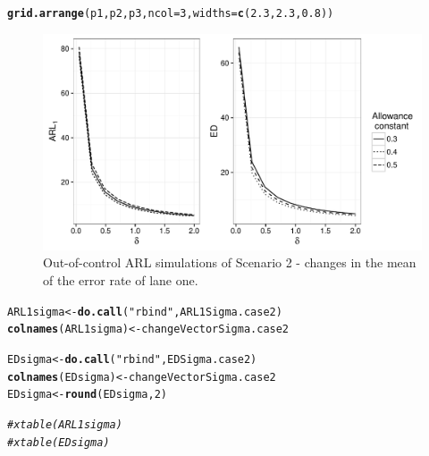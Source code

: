 \documentclass[a4paper,11pt,fleqn,twoside,notitlepage]{report}
\makeatletter
\def\maxwidth{ %
  \ifdim\Gin@nat@width>\linewidth
    \linewidth
  \else
    \Gin@nat@width
  \fi
}
\newcommand{\hlnum}[1]{\textcolor[rgb]{0.686,0.059,0.569}{#1}}%
\newcommand{\hlstr}[1]{\textcolor[rgb]{0.192,0.494,0.8}{#1}}%
\newcommand{\hlcom}[1]{\textcolor[rgb]{0.678,0.584,0.686}{\textit{#1}}}%
\newcommand{\hlstd}[1]{\textcolor[rgb]{0.345,0.345,0.345}{#1}}%
\newcommand{\hlkwb}[1]{\textcolor[rgb]{0.69,0.353,0.396}{#1}}%
\newcommand{\hlkwc}[1]{\textcolor[rgb]{0.333,0.667,0.333}{#1}}%
\newcommand{\hlkwd}[1]{\textcolor[rgb]{0.737,0.353,0.396}{\textbf{#1}}}%
\newenvironment{kframe}{%
 \def\at@end@of@kframe{}%
 \ifinner\ifhmode%
  \def\at@end@of@kframe{\end{minipage}}%
  \begin{minipage}{\columnwidth}%
 \fi\fi%
 \def\FrameCommand##1{\hskip\@totalleftmargin \hskip-\fboxsep
 \colorbox{shadecolor}{##1}\hskip-\fboxsep
     \hskip-\linewidth \hskip-\@totalleftmargin \hskip\columnwidth}%
 \MakeFramed {\advance\hsize-\width
   \@totalleftmargin\z@ \linewidth\hsize
   \@setminipage}}%
 {\par\unskip\endMakeFramed%
 \at@end@of@kframe}
\newenvironment{knitrout}{}{} %
\makeatother
\begin{document}
\begin{knitrout}
\begin{kframe}
\begin{alltt}
\hlkwd{grid.arrange}\hlstd{(p1,p2,p3,} \hlkwc{ncol}\hlstd{=}\hlnum{3}\hlstd{,} \hlkwc{widths}\hlstd{=}\hlkwd{c}\hlstd{(}\hlnum{2.3}\hlstd{,} \hlnum{2.3}\hlstd{,} \hlnum{0.8}\hlstd{))}
\end{alltt}
\end{kframe}\begin{figure}
\includegraphics[width=\maxwidth]{figure/ARL1meanCase2-1} \caption[Out-of-control ARL simulations of Scenario 2 - changes in the mean of the error rate of lane one]{Out-of-control ARL simulations of Scenario 2 - changes in the mean of the error rate of lane one.}\label{fig:ARL1meanCase2}
\end{figure}


\end{knitrout}

\begin{knitrout}
\color{fgcolor}\begin{kframe}
\begin{alltt}
\hlstd{ARL1sigma} \hlkwb{<-} \hlkwd{do.call}\hlstd{(}\hlstr{"rbind"}\hlstd{,ARL1Sigma.case2)}
\hlkwd{colnames}\hlstd{(ARL1sigma)} \hlkwb{<-}  \hlstd{changeVectorSigma.case2}

\hlstd{EDsigma} \hlkwb{<-} \hlkwd{do.call}\hlstd{(}\hlstr{"rbind"}\hlstd{, EDSigma.case2)}
\hlkwd{colnames}\hlstd{(EDsigma)} \hlkwb{<-}  \hlstd{changeVectorSigma.case2}
\hlstd{EDsigma}\hlkwb{<-} \hlkwd{round}\hlstd{(EDsigma,}\hlnum{2}\hlstd{)}

\hlcom{#xtable(ARL1sigma)}
\hlcom{#xtable(EDsigma)}
\end{alltt}
\end{kframe}
\end{knitrout}
\end{document}
